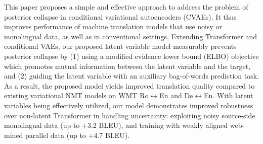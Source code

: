 This paper proposes a simple and effective approach to address the problem of posterior collapse in conditional variational autoencoders (CVAEs). It thus improves performance of machine translation models that use noisy or monolingual data, as well as in conventional settings. Extending Transformer and conditional VAEs, our proposed latent variable model measurably prevents posterior collapse by (1) using a modified evidence lower bound (ELBO) objective which promotes mutual information between the latent variable and the target, and (2) guiding the latent variable with an auxiliary bag-of-words prediction task. As a result, the proposed model yields improved translation quality compared to existing variational NMT models on WMT Ro$\leftrightarrow$En and De$\leftrightarrow$En. With latent variables being effectively utilized, our model demonstrates improved robustness over non-latent Transformer in handling uncertainty: exploiting noisy source-side monolingual data (up to +3.2 BLEU), and training with weakly aligned web-mined parallel data (up to +4.7 BLEU).
